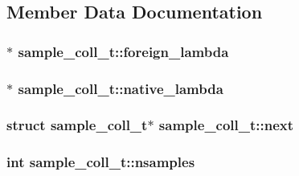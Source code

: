 \subsection{\-Member \-Data \-Documentation}
\hypertarget{structsample__coll__t_a4adb6e8e09af8427701909139e61ab00}{
\subsubsection[{foreign\-\_\-lambda}]{$\ast$ {\bf sample\-\_\-coll\-\_\-t\-::foreign\-\_\-lambda}}}\label{structsample__coll__t_a4adb6e8e09af8427701909139e61ab00}
\hypertarget{structsample__coll__t_a9a61eaedd2791d72c64d4005feae14cf}{
\subsubsection[{native\-\_\-lambda}]{$\ast$ {\bf sample\-\_\-coll\-\_\-t\-::native\-\_\-lambda}}}\label{structsample__coll__t_a9a61eaedd2791d72c64d4005feae14cf}
\hypertarget{structsample__coll__t_ad7c5e688f7955ca81142fd9e568bddf8}{
\subsubsection[{next}]{\setlength{\rightskip}{0pt plus 5cm}struct {\bf sample\-\_\-coll\-\_\-t}$\ast$ {\bf sample\-\_\-coll\-\_\-t\-::next}}}\label{structsample__coll__t_ad7c5e688f7955ca81142fd9e568bddf8}
\hypertarget{structsample__coll__t_ad622ee8c76b4947f3ef92194a0d703d6}{
\subsubsection[{nsamples}]{\setlength{\rightskip}{0pt plus 5cm}int {\bf sample\-\_\-coll\-\_\-t\-::nsamples}}}\label{structsample__coll__t_ad622ee8c76b4947f3ef92194a0d703d6}
